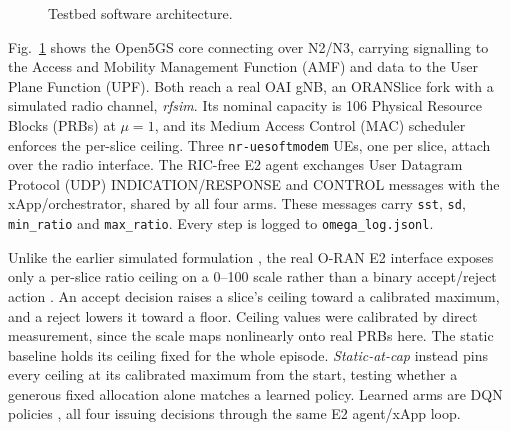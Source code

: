 \documentclass[10pt]{article}
\begin{document}
\begin{figure}[t]
\caption{Testbed software architecture.}
\label{fig:architecture}
\end{figure}

Fig.~\ref{fig:architecture} shows the Open5GS core connecting over
N2/N3, carrying signalling to the Access and Mobility Management
Function (AMF) and data to the User Plane Function (UPF). Both reach
a real OAI gNB, an ORANSlice fork \cite{oranslice} with a simulated
radio channel, \textit{rfsim}. Its nominal capacity is 106 Physical Resource
Blocks (PRBs) at $\mu=1$, and its Medium Access Control (MAC)
scheduler enforces the per-slice ceiling. Three
\texttt{nr-uesoftmodem} UEs, one per slice, attach over the radio
interface. The RIC-free E2
agent exchanges User Datagram Protocol (UDP) INDICATION/RESPONSE and
CONTROL messages with the xApp/orchestrator, shared by all four arms.
These messages carry \texttt{sst}, \texttt{sd}, \texttt{min\_ratio}
and \texttt{max\_ratio}. Every step is logged to
\texttt{omega\_log.jsonl}.

Unlike the earlier simulated formulation \cite{mecon-paper1,icraie-paper2},
the real O-RAN E2 interface exposes only a per-slice ratio ceiling on
a 0--100 scale rather than a binary accept/reject action
\cite{oran-e2ap}. An accept decision raises a slice's ceiling toward
a calibrated maximum, and a reject lowers it toward a floor. Ceiling
values were calibrated by direct measurement, since the scale maps
nonlinearly onto real PRBs here. The static baseline holds its
ceiling fixed for the whole episode. \emph{Static-at-cap} instead pins every
ceiling at its calibrated maximum from the start, testing whether a
generous fixed allocation alone matches a learned policy. Learned
arms are DQN policies \cite{dqn}, all four issuing decisions through
the same E2 agent/xApp loop.
\end{document}

